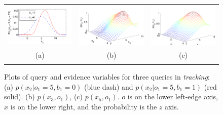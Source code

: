 \documentclass[letterpaper]{article}
\begin{document}
{%
\begin{figure}[t!]
\vspace{-5mm}
\begin{center}
\begin{tabular}{ccc}
\hspace{-3mm} \includegraphics[width=160pt]{radar_x_2_fix.pdf} & \hspace{-5mm} \includegraphics[width=160pt]{tracker_3d_x3o1_aistat.pdf} & \hspace{-4mm} \includegraphics[width=160pt]{tracker_3d_x5o1_aistat.pdf}\\ %
(a) & (b) & (c) \\
\multicolumn{3}{c}{}
\end{tabular}
\end{center}
\vspace{-6mm}
\caption{\footnotesize Plots of query and evidence variables for three
queries in \emph{tracking}: (a)  $p(x_2|o_1=5,b_1=0)$ (blue dash)
and $p(x_2|o_1=5,b_1=1)$ (red solid).
(b) $p(x_3,o_1)$, (c) $p(x_5,o_1)$.  $o$ is on the lower left-edge
axis, $x$ is on the lower right, and the probability is the $z$ axis.}
\label{fig:track}
\end{figure}

}
\end{document}
